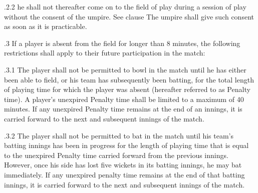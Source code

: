 \documentclass[12pt]{article}
\begin{document}
\vspace{\baselineskip}
\begin{adjustwidth}{1.18in}{0.06in}
{\fontsize{9pt}{10.8pt}.2.2 \tabto{1.17in} he shall not thereafter come on to the field of play during a session of play without the consent of the umpire. See clause The umpire shall give such consent as soon as it is practicable.\par}\par

\end{adjustwidth}


\vspace{\baselineskip}
\begin{adjustwidth}{0.5in}{0.29in}
{\fontsize{9pt}{10.8pt}.3 \tabto{0.49in} If a player is absent from the field for longer than 8 minutes, the following restrictions shall apply to their future participation in the match:\par}\par

\end{adjustwidth}


\vspace{\baselineskip}
\begin{adjustwidth}{1.18in}{0.08in}
{\fontsize{9pt}{10.8pt}.3.1 \tabto{1.17in} The player shall not be permitted to bowl in the match until he has either been able to field, or his team has subsequently been batting, for the total length of playing time for which the player was absent (hereafter referred to as Penalty time). A player’s unexpired Penalty time shall be limited to a maximum of 40 minutes. If any unexpired Penalty time remains at the end of an innings, it is carried forward to the next and subsequent innings of the match.\par}\par

\end{adjustwidth}


\vspace{\baselineskip}
\begin{adjustwidth}{1.18in}{0.0in}
{\fontsize{9pt}{10.8pt}.3.2 \tabto{1.17in} The player shall not be permitted to bat in the match until his team’s batting innings has been in progress for the length of playing time that is equal to the unexpired Penalty time carried forward from the previous innings. However, once his side has lost five wickets in its batting innings, he may bat immediately. If any unexpired penalty time remains at the end of that batting innings, it is carried forward to the next and subsequent innings of the match.\par}\par

\end{adjustwidth}
\end{document}
